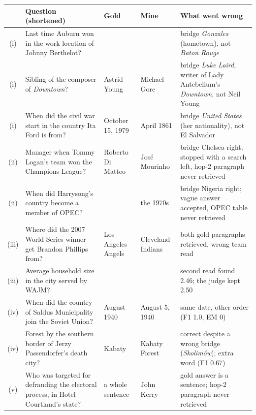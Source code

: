 \documentclass[10pt,a4paper]{article}
\begin{document}
\begin{center}
\footnotesize\renewcommand{\arraystretch}{1.12}
\begin{tabularx}{\textwidth}{@{}c>{\raggedright\arraybackslash}X>{\raggedright\arraybackslash}p{2.3cm}>{\raggedright\arraybackslash}p{2.6cm}>{\raggedright\arraybackslash}p{3.9cm}@{}}
\toprule
& Question (shortened) & Gold & Mine & What went wrong\\
\midrule
(i) & Last time Auburn won in the work location of Johnny Berthelot? & 1999 & 1994 & bridge \emph{Gonzales} (hometown), not \emph{Baton Rouge}\\
(i) & Sibling of the composer of \emph{Downtown}? & Astrid Young & Michael Gore & bridge \emph{Luke Laird}, writer of Lady Antebellum's \emph{Downtown}, not Neil Young\\
(i) & When did the civil war start in the country Ita Ford is from? & October 15, 1979 & April 1861 & bridge \emph{United States} (her nationality), not El Salvador\\
(ii) & Manager when Tommy Logan's team won the Champions League? & Roberto Di Matteo & Jos\'e Mourinho & bridge Chelsea right; stopped with a search left, hop-2 paragraph never retrieved\\
(ii) & When did Harrysong's country become a member of OPEC? & 1971 & the 1970s & bridge Nigeria right; vague answer accepted, OPEC table never retrieved\\
(iii) & Where did the 2007 World Series winner get Brandon Phillips from? & Los Angeles Angels & Cleveland Indians & both gold paragraphs retrieved, wrong team read\\
(iii) & Average household size in the city served by WAJM? & 2.46 & 2.50 & second read found 2.46; the judge kept 2.50\\
(iv) & When did the country of Saldus Municipality join the Soviet Union? & 5 August 1940 & August 5, 1940 & same date, other order (F1 1.0, EM 0)\\
(iv) & Forest by the southern border of Jerzy Passendorfer's death city? & Kabaty & Kabaty Forest & correct despite a wrong bridge (\emph{Skolim\'ow}); extra word (F1 0.67)\\
(v) & Who was targeted for defrauding the electoral process, in Hotel Courtland's state? & a whole sentence & John Kerry & gold answer is a sentence; hop-2 paragraph never retrieved\\
\bottomrule
\end{tabularx}
\label{tab:err}
\end{center}
\end{document}
